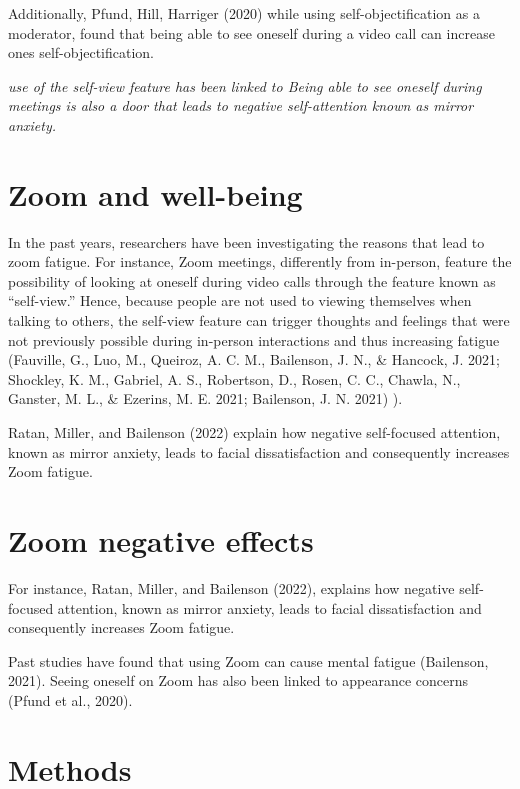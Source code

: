 \documentclass[
  english,
  man]{apa7}
\begin{document}
Additionally, Pfund, Hill, Harriger (2020) while using self-objectification as a moderator, found that being able to see oneself during a video call can increase ones self-objectification.

\emph{use of the self-view feature has been linked to Being able to see oneself during meetings is also a door that leads to negative self-attention known as mirror anxiety.}

\hypertarget{zoom-and-well-being}{%
\section{Zoom and well-being}\label{zoom-and-well-being}}

In the past years, researchers have been investigating the reasons that lead to zoom fatigue. For instance, Zoom meetings, differently from in-person, feature the possibility of looking at oneself during video calls through the feature known as ``self-view.'' Hence, because people are not used to viewing themselves when talking to others, the self-view feature can trigger thoughts and feelings that were not previously possible during in-person interactions and thus increasing fatigue (Fauville, G., Luo, M., Queiroz, A. C. M., Bailenson, J. N., \& Hancock, J. 2021; Shockley, K. M., Gabriel, A. S., Robertson, D., Rosen, C. C., Chawla, N., Ganster, M. L., \& Ezerins, M. E. 2021; Bailenson, J. N. 2021) ).

Ratan, Miller, and Bailenson (2022) explain how negative self-focused attention, known as mirror anxiety, leads to facial dissatisfaction and consequently increases Zoom fatigue.

\hypertarget{zoom-negative-effects}{%
\section{Zoom negative effects}\label{zoom-negative-effects}}

For instance, Ratan, Miller, and Bailenson (2022), explains how negative self-focused attention, known as mirror anxiety, leads to facial dissatisfaction and consequently increases Zoom fatigue.

Past studies have found that using Zoom can cause mental fatigue (Bailenson, 2021). Seeing oneself on Zoom has also been linked to appearance concerns (Pfund et al., 2020).

\hypertarget{methods}{%
\section{Methods}\label{methods}}
\end{document}
